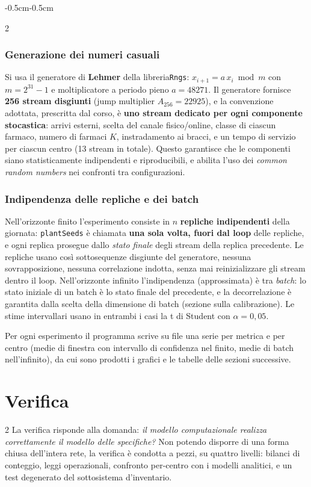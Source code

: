 \documentclass{article}
\begin{document}
\begin{adjustwidth}{-0.5cm}{-0.5cm}
\begin{multicols}{2}
\subsubsection*{Generazione dei numeri casuali}
Si usa il generatore di \textbf{Lehmer} della libreria\texttt{Rngs}: $x_{i+1} = a\,
x_i \bmod m$ con $m = 2^{31}-1$ e moltiplicatore a periodo pieno $a = 48271$. Il generatore
fornisce \textbf{256 stream disgiunti} (jump multiplier $A_{256}=22925$), e la convenzione
adottata,  prescritta dal corso,  è \textbf{uno stream dedicato per ogni componente
stocastica}: arrivi esterni, scelta del canale fisico/online, classe di ciascun farmaco, numero
di farmaci $K$, instradamento ai bracci, e un tempo di servizio per ciascun centro (13 stream in
totale). Questo garantisce che le componenti siano statisticamente indipendenti e riproducibili, e
abilita l'uso dei \emph{common random numbers} nei confronti tra configurazioni.

\subsubsection*{Indipendenza delle repliche e dei batch}
Nell'orizzonte finito l'esperimento consiste in $n$ \textbf{repliche indipendenti} della giornata:
\texttt{plantSeeds} è chiamata \textbf{una sola volta, fuori dal loop} delle repliche, e ogni
replica prosegue dallo \emph{stato finale} degli stream della replica precedente. Le repliche
usano così sottosequenze disgiunte del generatore,  nessuna sovrapposizione, nessuna
correlazione indotta,  senza mai reinizializzare gli stream dentro il loop. Nell'orizzonte
infinito l'indipendenza (approssimata) è tra \emph{batch}: lo stato iniziale di un batch è lo
stato finale del precedente, e la decorrelazione è garantita dalla scelta della dimensione di
batch (sezione sulla calibrazione). Le stime intervallari usano in entrambi i casi la
t di Student con $\alpha = 0{,}05$.

Per ogni esperimento il programma scrive su file una serie per metrica e per centro (medie di
finestra con intervallo di confidenza nel finito, medie di batch nell'infinito), da cui sono
prodotti i grafici e le tabelle delle sezioni successive.
\end{multicols}



\newpage
\section{Verifica}
\begin{multicols}{2}
La verifica risponde alla domanda: \emph{il modello computazionale realizza correttamente il
modello delle specifiche?} Non potendo disporre di una forma chiusa dell'intera rete, la verifica
è condotta a pezzi, su quattro livelli: bilanci di conteggio, leggi operazionali, confronto
per-centro con i modelli analitici, e un test degenerato del sottosistema d'inventario.


\end{multicols}
\end{adjustwidth}
\end{document}

